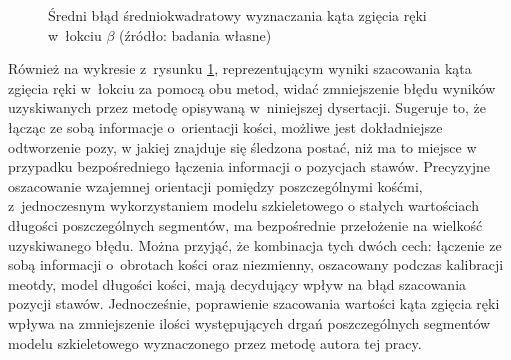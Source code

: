 	\begin{figure}[!htb]
		\centering
		\caption{Średni błąd średniokwadratowy wyznaczania kąta zgięcia ręki w~łokciu $\beta$ (źródło: badania własne)}
		\label{fig:experiments:angle:summary}
	\end{figure}


Również na wykresie z~rysunku \ref{fig:experiments:angle:summary}, reprezentującym wyniki szacowania kąta zgięcia ręki w~łokciu za pomocą obu metod, widać zmniejszenie błędu wyników uzyskiwanych przez metodę opisywaną w~niniejszej dysertacji. Sugeruje to, że łącząc ze sobą informacje o~orientacji kości, możliwe jest dokładniejsze odtworzenie pozy, w jakiej znajduje się śledzona postać, niż ma to miejsce w przypadku bezpośredniego łączenia informacji o pozycjach stawów. Precyzyjne oszacowanie wzajemnej orientacji pomiędzy poszczególnymi kośćmi, z~jednoczesnym wykorzystaniem modelu szkieletowego o stałych wartościach długości poszczególnych segmentów, ma bezpośrednie przełożenie na wielkość uzyskiwanego błędu. Można przyjąć, że kombinacja tych dwóch cech: łączenie ze sobą informacji o~obrotach kości oraz niezmienny, oszacowany podczas kalibracji meotdy, model długości kości, mają decydujący wpływ na błąd szacowania pozycji stawów. Jednocześnie, poprawienie szacowania wartości kąta zgięcia ręki wpływa na zmniejszenie ilości występujących drgań poszczególnych segmentów modelu szkieletowego wyznaczonego przez metodę autora tej pracy.